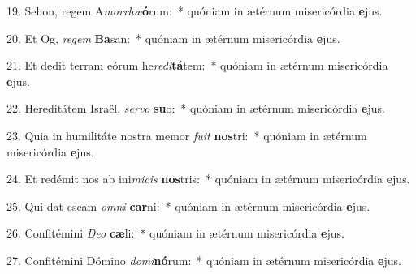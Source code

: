 19. Sehon, regem A\textit{mor}\textit{rhæ}\textbf{ó}rum:~*  quóniam in ætérnum misericórdia \textbf{e}jus.\

20. Et Og, \textit{re}\textit{gem} \textbf{Ba}san:~*  quóniam in ætérnum misericórdia \textbf{e}jus.\

21. Et dedit terram eórum he\textit{re}\textit{di}\textbf{tá}tem:~*  quóniam in ætérnum misericórdia \textbf{e}jus.\

22. Hereditátem Israël, \textit{ser}\textit{vo} \textbf{su}o:~*  quóniam in ætérnum misericórdia \textbf{e}jus.\

23. Quia in humilitáte nostra memor \textit{fu}\textit{it} \textbf{nos}tri:~*  quóniam in ætérnum misericórdia \textbf{e}jus.\

24. Et redémit nos ab ini\textit{mí}\textit{cis} \textbf{nos}tris:~*  quóniam in ætérnum misericórdia \textbf{e}jus.\

25. Qui dat escam \textit{om}\textit{ni} \textbf{car}ni:~*  quóniam in ætérnum misericórdia \textbf{e}jus.\

26. Confitémini \textit{De}\textit{o} \textbf{cæ}li:~*  quóniam in ætérnum misericórdia \textbf{e}jus.\

27. Confitémini Dómino \textit{do}\textit{mi}\textbf{nó}rum:~*  quóniam in ætérnum misericórdia \textbf{e}jus.\

